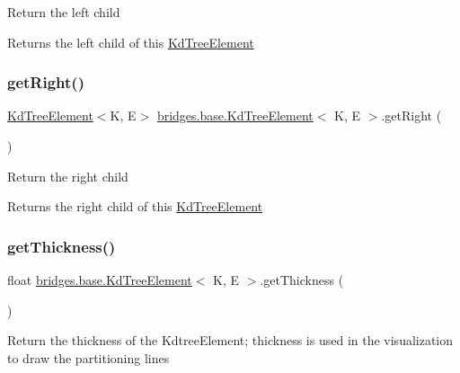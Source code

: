 Return the left child

\begin{DoxyReturn}{Returns}
the left child of this \hyperlink{classbridges_1_1base_1_1_kd_tree_element}{Kd\+Tree\+Element} 
\end{DoxyReturn}
\mbox{\label{classbridges_1_1base_1_1_kd_tree_element_a990694a36d44aba5f844f1752692c8e6}} 
\subsubsection{\texorpdfstring{get\+Right()}{getRight()}}
{\footnotesize\ttfamily \hyperlink{classbridges_1_1base_1_1_kd_tree_element}{Kd\+Tree\+Element}$<$K, E$>$ \hyperlink{classbridges_1_1base_1_1_kd_tree_element}{bridges.\+base.\+Kd\+Tree\+Element}$<$ K, E $>$.get\+Right (\begin{DoxyParamCaption}{ }\end{DoxyParamCaption})}

Return the right child

\begin{DoxyReturn}{Returns}
the right child of this \hyperlink{classbridges_1_1base_1_1_kd_tree_element}{Kd\+Tree\+Element} 
\end{DoxyReturn}
\mbox{\label{classbridges_1_1base_1_1_kd_tree_element_a27c0b086af284210855ee5f1c90e7484}} 
\subsubsection{\texorpdfstring{get\+Thickness()}{getThickness()}}
{\footnotesize\ttfamily float \hyperlink{classbridges_1_1base_1_1_kd_tree_element}{bridges.\+base.\+Kd\+Tree\+Element}$<$ K, E $>$.get\+Thickness (\begin{DoxyParamCaption}{ }\end{DoxyParamCaption})}

Return the thickness of the Kdtree\+Element; thickness is used in the visualization to draw the partitioning lines

